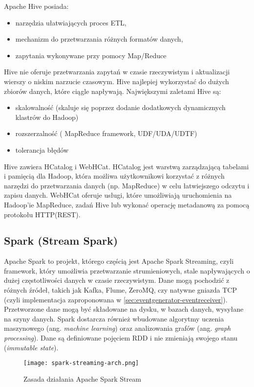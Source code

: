 Apache Hive posiada:
\begin{itemize}[noitemsep]
\item narzędzia ułatwiających proces ETL,
\item mechanizm do przetwarzania różnych formatów danych,
\item zapytania wykonywane przy pomocy Map/Reduce
\end{itemize}

Hive nie oferuje przetwarzania zapytań w czasie rzeczywistym i aktualizacji wierszy o niskim narzucie czasowym. Hive najlepiej wykorzystać do dużych zbiorów danych, które ciągle napływają. Największymi zaletami Hive są:
\begin{itemize}[noitemsep]
\item skalowalność (skaluje się poprzez dodanie dodatkowych dynamicznych klastrów do Hadoop)
\item rozszerzalność ( MapReduce framework, UDF/UDA/UDTF)
\item tolerancja błędów
\end{itemize}
Hive zawiera HCatalog i WebHCat. HCatalog jest warstwą zarządzającą tabelami i pamięcią dla Hadoop, która możliwa użytkownikowi korzystać z różnych narzędzi do przetwarzania danych (np. MapReduce) w celu łatwiejszego odczytu i zapisu danych. WebHCat oferuje usługi, które umożliwiają uruchomienia na Hadoop'ie MapReduce, zadań Hive lub wykonać operację metadanową za pomocą protokołu HTTP(REST).


\subsection{Spark (Stream Spark)}
\label{sec:solutions:spark}

Apache Spark to projekt, którego częścią jest Apache Spark Streaming, czyli framework, który umożliwia przetwarzanie strumieniowych, stale napływających o dużej częstotliwości danych w czasie rzeczywistym. Dane mogą pochodzić z różnych źródeł, takich jak Kafka, Flume, ZeroMQ, czy natywne gniazda TCP (czyli implementacja zaproponowana w \ref{sec:eventgenerator-eventreceiver}). Przetworzone dane mogą być składowane na dysku, w bazach danych, wysyłane na szyny danych. Spark dostarcza również wbudowane algorytmy uczenia maszynowego (ang. \emph{machine learning}) oraz analizowania grafów (ang. \emph{graph processing}). Dane są definiowane pojęciem RDD\cite{manual-apache-spark-streaming} i nie zmieniają swojego stanu (\emph{immutable state}).

\begin{figure}[h!]
  \centering
    \texttt{[image: spark-streaming-arch.png]}
  \caption{Zasada działania Apache Spark Stream}
  \label{fig:spark-streaming-arch}
\end{figure}

